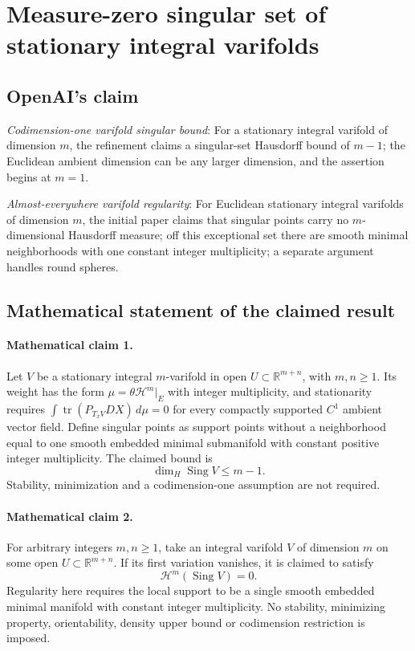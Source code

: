 \documentclass[11pt]{article}
\begin{document}
\section*{Measure-zero singular set of stationary integral varifolds}

\subsection{OpenAI's claim}
\textit{Codimension-one varifold singular bound}: For a stationary integral varifold of dimension $m$, the refinement claims a singular-set Hausdorff bound of $m-1$; the Euclidean ambient dimension can be any larger dimension, and the assertion begins at $m=1$.

\textit{Almost-everywhere varifold regularity}: For Euclidean stationary integral varifolds of dimension $m$, the initial paper claims that singular points carry no $m$-dimensional Hausdorff measure; off this exceptional set there are smooth minimal neighborhoods with one constant integer multiplicity; a separate argument handles round spheres.

\subsection{Mathematical statement of the claimed result}
\paragraph{Mathematical claim 1.} Let $V$ be a stationary integral $m$-varifold in open $U\subset\mathbb R^{m+n}$, with $m,n\ge1$. Its weight has the form $\mu=\theta\mathcal H^m|_E$ with integer multiplicity, and stationarity requires $\int\operatorname{tr}(P_{T_xV}DX)\,d\mu=0$ for every compactly supported $C^1$ ambient vector field. Define singular points as support points without a neighborhood equal to one smooth embedded minimal submanifold with constant positive integer multiplicity. The claimed bound is \[\dim_H\operatorname{Sing}V\le m-1.\] Stability, minimization and a codimension-one assumption are not required.

\paragraph{Mathematical claim 2.} For arbitrary integers $m,n\ge1$, take an integral varifold $V$ of dimension $m$ on some open $U\subset\mathbb R^{m+n}$. If its first variation vanishes, it is claimed to satisfy \[\mathcal H^m(\operatorname{Sing}V)=0.\] Regularity here requires the local support to be a single smooth embedded minimal manifold with constant integer multiplicity. No stability, minimizing property, orientability, density upper bound or codimension restriction is imposed.
\end{document}
